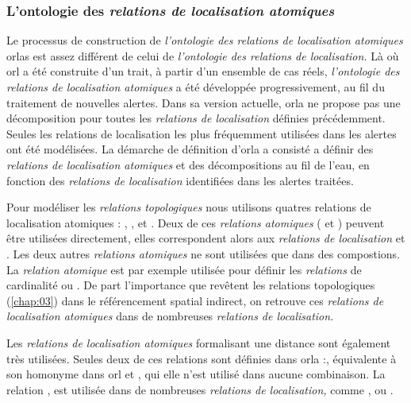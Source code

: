%   

\subsubsection{L'ontologie des \emph{relations de localisation
    atomiques}}

Le processus de construction de \emph{l'ontologie des relations de
  localisation atomiques} \acp{orla} est assez différent de celui de
\emph{l'ontologie des relations de localisation.} Là où \ac{orl} a été
construite d'un trait, à partir d'un ensemble de cas réels,
\emph{l'ontologie des relations de localisation atomiques} a été
développée progressivement, au fil du traitement de nouvelles
alertes. Dans sa version actuelle, \ac{orla} ne propose pas une
décomposition pour toutes les \emph{relations de localisation}
définies précédemment. Seules les relations de localisation les plus
fréquemment utilisées dans les alertes ont été modélisées.  La
démarche de définition d'\ac{orla} a consisté a définir des
\emph{relations de localisation atomiques} et des décompositions au
fil de l'eau, en fonction des \emph{relations de localisation}
identifiées dans les alertes traitées.

Pour modéliser les \emph{relations topologiques} nous utilisons
quatres relations de localisation atomiques :
,
,
 et . Deux de
ces \emph{relations atomiques} ( et
) peuvent être utilisées
directement, elles correspondent alors aux \emph{relations de
  localisation}  et
. Les deux autres \emph{relations
  atomiques} ne sont utilisées que dans des compostions. La
\emph{relation atomique}  est par
exemple utilisée pour définir les \emph{relations} de cardinalité
 ou
. De part l'importance que
revêtent les relations topologiques (\autoref{chap:03}) dans le
référencement spatial indirect, on retrouve ces \emph{relations de
  localisation atomiques} dans de nombreuses \emph{relations de
  localisation.}

Les \emph{relations de localisation atomiques} formalisant une
distance sont également très utilisées. Seules deux de ces relations
sont définies dans \ac{orla}
:,
équivalente à son homonyme dans \ac{orl} et
, qui elle n'est utilisé dans
aucune combinaison. La relation
,
est utilisée dans de nombreuses \emph{relations de localisation,}
comme ,  ou
.

